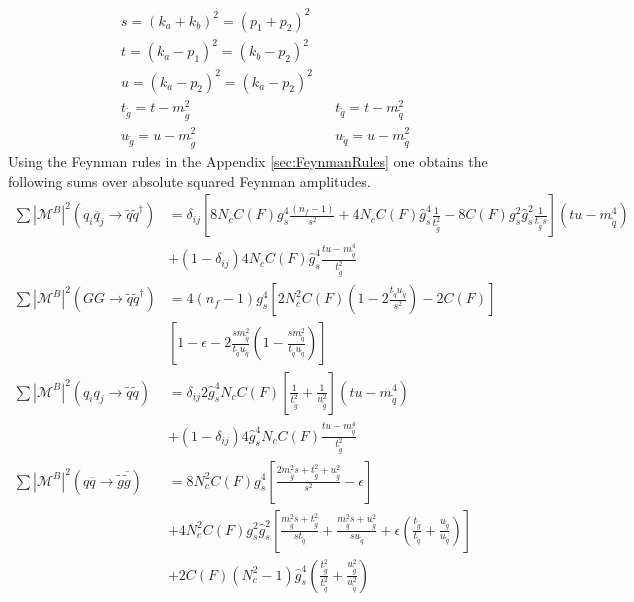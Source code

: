 \begin{align}
& s = (k_a + k_b)^2 = (p_1 + p_2)^2\nonumber\\
& t = (k_a - p_1)^2 = (k_b - p_2)^2\nonumber\\
& u = (k_a - p_2)^2 = (k_a - p_2)^2\nonumber\\
& t_{\tilde{g}} = t - m_{\tilde{g}}^2 && t_{\tilde{q}} = t- m_{\tilde{q}}^2\nonumber\\
& u_{\tilde{g}} = u - m_{\tilde{g}}^2 && u_{\tilde{q}} = u- m_{\tilde{q}}^2
\end{align}
Using the Feynman rules in the Appendix \ref{sec:FeynmanRules} one obtains the following sums over absolute squared Feynman amplitudes.
\begin{align}
\sum|\mathcal{M}^B|^2(q_i\overline{q}_j \to \tilde{q}\tilde{q}^\dagger) &= \delta_{ij}  \left[ 8 N_c C(F) g_s^4\frac{(n_f-1)}{s^2} + 4 N_c C(F) \hat{g}_s^4\frac{1}{t_{\tilde{g}}^2} - 8 C(F)g_s^2\hat{g}_s^2\frac{1}{ t_{\tilde{g}} s} \right] (tu-m_{\tilde{q}}^4)\nonumber\\
 &+ (1-\delta_{ij}) 4 N_c C(F) \hat{g}_s^4\frac{tu-m_{\tilde{q}}^4}{t_{\tilde{g}}^2} \\
\sum|\mathcal{M}^B|^2(GG \to \tilde{q}\tilde{q}^\dagger) &= 4 (n_f-1) g_s^4 \left[ 2N_c^2C(F) \left(1 - 2\frac{t_{\tilde{q}}u_{\tilde{q}}}{s^2} \right)- 2C(F) \right]\nonumber\\
& \left[ 1 - \epsilon - 2\frac{s m_{\tilde{q}}^2}{t_{\tilde{q}}u_{\tilde{q}}} \left( 1-\frac{s m_{\tilde{q}}^2}{t_{\tilde{q}}u_{\tilde{q}}} \right)\right]\\
\sum|\mathcal{M}^B|^2(q_i q_j \to \tilde{q}\tilde{q}) &= \delta_{ij} 2\hat{g}_s^4 N_c C(F)\left[ \frac{1}{t_{\tilde{g}}^2} + \frac{1}{u_{\tilde{g}}^2} \right] (tu-m_{\tilde{q}}^4)\nonumber\\ 
& + (1-\delta_{ij}) 4 \hat{g}_s^4 N_c C(F) \frac{tu-m_{\tilde{q}}^4}{t_{\tilde{g}}^2}\\
\sum|\mathcal{M}^B|^2(q\overline{q} \to \tilde{g}\overline{\tilde{g}}) &=  8 N_c^2 C(F) g_s^4 \left[ \frac{2m_{\tilde{g}}^2 s + t_{\tilde{g}}^2 + u_{\tilde{g}}^2}{s^2} -\epsilon \right]\nonumber\\
& + 4 N_c^2 C(F) g_s^2 \hat{g}_s^2 \left[ \frac{m_{\tilde{g}}^2 s + t_{\tilde{g}}^2}{s t_{\tilde{q}}} + \frac{m_{\tilde{g}}^2 s + u_{\tilde{g}}^2}{su_{\tilde{q}}} + \epsilon\left( \frac{t_{\tilde{g}}}{t_{\tilde{q}}} + \frac{u_{\tilde{g}}}{u_{\tilde{q}}} \right) \right]\nonumber\\
& + 2C(F)(N_c^2-1) \hat{g}^4_s \left( \frac{t_{\tilde{g}}^2}{t_{\tilde{q}}^2} + \frac{u_{\tilde{g}}^2}{u_{\tilde{q}}^2} \right)\\

\end{align}
